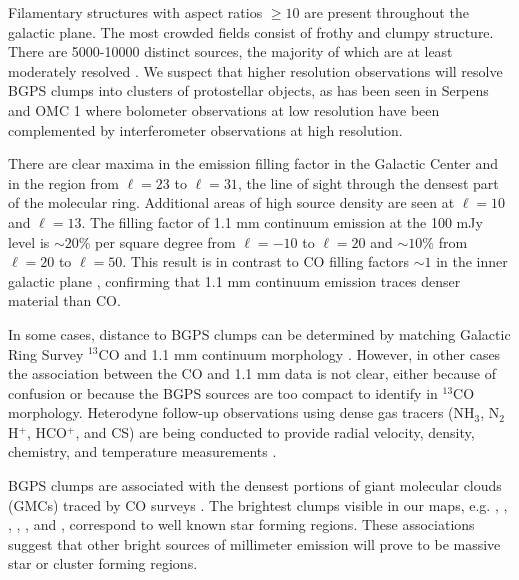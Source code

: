 \documentclass[12pt,preprint]{aastex}
\newcommand{\lon}{\ensuremath{\ell}}
\begin{document}

Filamentary structures with aspect ratios $\geq 10$ are present
throughout the galactic plane.  The most crowded fields consist of
frothy and clumpy structure.  There are 5000-10000 distinct sources,
the majority of which are at least moderately resolved
\citep{rosolowsky09}.  We suspect that higher resolution observations
will resolve BGPS clumps into clusters of protostellar objects, as has
been seen in Serpens \citep{enoch08,Testi1998} and OMC 1
\citep{Beuther2004,johnstone99} where bolometer observations at low
resolution have been complemented by interferometer observations at
high resolution.

There are clear maxima in the emission filling factor in the Galactic
Center and in the region from $\lon=23$ to $\lon=31$, the line of sight
through the densest part of the molecular ring.  Additional areas of
high source density are seen at $\lon=10$ and $\lon=13$.  The filling factor
of 1.1 mm continuum emission at the 100 mJy level is $\sim 20$\% per
square degree from $\lon=-10$ to $\lon=20$ and $\sim 10$\% from $\lon=20$ to
$\lon=50$.
This result is in contrast to CO filling factors $\sim1$ in the inner galactic
plane \citep{dame01,FCRAO}, confirming that 1.1 mm continuum emission traces
denser material than CO.  

In some cases, distance to BGPS clumps can be determined by matching
Galactic Ring Survey $^{13}$CO and 1.1 mm continuum morphology
\citep{IRDCdistance,FCRAO}.  However, in other cases the association
between the CO and 1.1 mm data is not clear, either because of
confusion or because the BGPS sources are too compact to identify in
$^{13}$CO morphology.  Heterodyne follow-up observations using dense
gas tracers (NH$_3$, N$_2$H$^+$, HCO$^+$, and CS) are being conducted
to provide radial velocity, density, chemistry, and temperature
measurements \citep{schlingman09, battersby09, nordhaus09}.

BGPS clumps are associated with the densest portions of giant
molecular clouds (GMCs) traced by CO surveys
\citep[e.g.,][]{dame01,FCRAO}.  The brightest clumps visible in our
maps, e.g. , , ,
, , and , correspond to well
known star forming regions.
These associations suggest that other bright sources of millimeter
emission will prove to be massive star or cluster forming regions.
\end{document}
